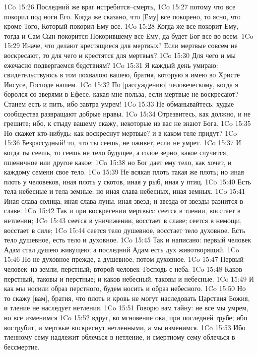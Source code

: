 1Co 15:26  Последний же враг истребится--смерть,
1Co 15:27  потому что все покорил под ноги Его. Когда же сказано, что [Ему] все покорено, то ясно, что кроме Того, Который покорил Ему все.
1Co 15:28  Когда же все покорит Ему, тогда и Сам Сын покорится Покорившему все Ему, да будет Бог все во всем.
1Co 15:29  Иначе, что делают крестящиеся для мертвых? Если мертвые совсем не воскресают, то для чего и крестятся для мертвых?
1Co 15:30  Для чего и мы ежечасно подвергаемся бедствиям?
1Co 15:31  Я каждый день умираю: свидетельствуюсь в том похвалою вашею, братия, которую я имею во Христе Иисусе, Господе нашем.
1Co 15:32  По [рассуждению] человеческому, когда я боролся со зверями в Ефесе, какая мне польза, если мертвые не воскресают? Станем есть и пить, ибо завтра умрем!
1Co 15:33  Не обманывайтесь: худые сообщества развращают добрые нравы.
1Co 15:34  Отрезвитесь, как должно, и не грешите; ибо, к стыду вашему скажу, некоторые из вас не знают Бога.
1Co 15:35  Но скажет кто-нибудь: как воскреснут мертвые? и в каком теле придут?
1Co 15:36  Безрассудный! то, что ты сеешь, не оживет, если не умрет.
1Co 15:37  И когда ты сеешь, то сеешь не тело будущее, а голое зерно, какое случится, пшеничное или другое какое;
1Co 15:38  но Бог дает ему тело, как хочет, и каждому семени свое тело.
1Co 15:39  Не всякая плоть такая же плоть; но иная плоть у человеков, иная плоть у скотов, иная у рыб, иная у птиц.
1Co 15:40  Есть тела небесные и тела земные; но иная слава небесных, иная земных.
1Co 15:41  Иная слава солнца, иная слава луны, иная звезд; и звезда от звезды разнится в славе.
1Co 15:42  Так и при воскресении мертвых: сеется в тлении, восстает в нетлении;
1Co 15:43  сеется в уничижении, восстает в славе; сеется в немощи, восстает в силе;
1Co 15:44  сеется тело душевное, восстает тело духовное. Есть тело душевное, есть тело и духовное.
1Co 15:45  Так и написано: первый человек Адам стал душею живущею; а последний Адам есть дух животворящий.
1Co 15:46  Но не духовное прежде, а душевное, потом духовное.
1Co 15:47  Первый человек--из земли, перстный; второй человек--Господь с неба.
1Co 15:48  Каков перстный, таковы и перстные; и каков небесный, таковы и небесные.
1Co 15:49  И как мы носили образ перстного, будем носить и образ небесного.
1Co 15:50  Но то скажу [вам], братия, что плоть и кровь не могут наследовать Царствия Божия, и тление не наследует нетления.
1Co 15:51  Говорю вам тайну: не все мы умрем, но все изменимся
1Co 15:52  вдруг, во мгновение ока, при последней трубе; ибо вострубит, и мертвые воскреснут нетленными, а мы изменимся.
1Co 15:53  Ибо тленному сему надлежит облечься в нетление, и смертному сему облечься в бессмертие.
